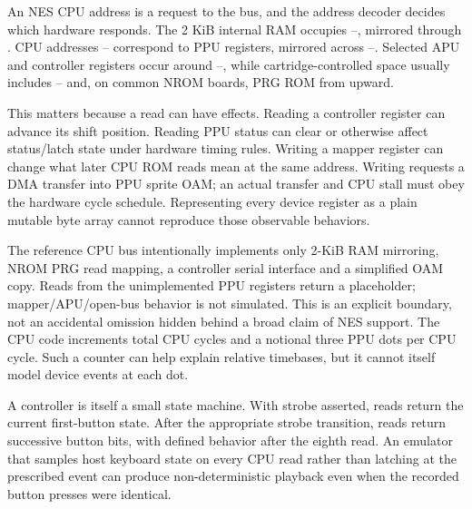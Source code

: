 An NES CPU address is a request to the bus, and the address decoder decides which hardware responds. The 2 KiB internal RAM occupies --, mirrored through . CPU addresses -- correspond to PPU registers, mirrored across --. Selected APU and controller registers occur around --, while cartridge-controlled space usually includes -- and, on common NROM boards, PRG ROM from  upward.

This matters because a read can have effects. Reading a controller register can advance its shift position. Reading PPU status can clear or otherwise affect status/latch state under hardware timing rules. Writing a mapper register can change what later CPU ROM reads mean at the same address. Writing  requests a DMA transfer into PPU sprite OAM; an actual transfer and CPU stall must obey the hardware cycle schedule. Representing every device register as a plain mutable byte array cannot reproduce those observable behaviors.

The reference CPU bus intentionally implements only 2-KiB RAM mirroring, NROM PRG read mapping, a controller serial interface and a simplified OAM copy. Reads from the unimplemented PPU registers return a placeholder; mapper/APU/open-bus behavior is not simulated. This is an explicit boundary, not an accidental omission hidden behind a broad claim of NES support. The CPU code increments total CPU cycles and a notional three PPU dots per CPU cycle. Such a counter can help explain relative timebases, but it cannot itself model device events at each dot.

A controller is itself a small state machine. With strobe asserted, reads return the current first-button state. After the appropriate strobe transition, reads return successive button bits, with defined behavior after the eighth read. An emulator that samples host keyboard state on every CPU read rather than latching at the prescribed event can produce non-deterministic playback even when the recorded button presses were identical.

